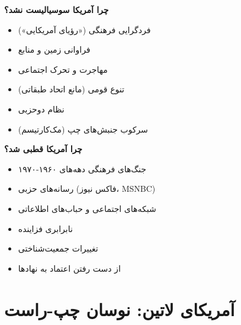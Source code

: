 \textbf{چرا آمریکا سوسیالیست نشد؟}
\begin{itemize}
    \item فردگرایی فرهنگی («رؤیای آمریکایی»)
    \item فراوانی زمین و منابع
    \item مهاجرت و تحرک اجتماعی
    \item تنوع قومی (مانع اتحاد طبقاتی)
    \item نظام دوحزبی
    \item سرکوب جنبش‌های چپ (مک‌کارتیسم)
\end{itemize}

\textbf{چرا آمریکا قطبی شد؟}
\begin{itemize}
    \item جنگ‌های فرهنگی دهه‌های ۱۹۶۰-۱۹۷۰
    \item رسانه‌های حزبی (فاکس نیوز، MSNBC)
    \item شبکه‌های اجتماعی و حباب‌های اطلاعاتی
    \item نابرابری فزاینده
    \item تغییرات جمعیت‌شناختی
    \item از دست رفتن اعتماد به نهادها
\end{itemize}


\section*{آمریکای لاتین: نوسان چپ-راست}


